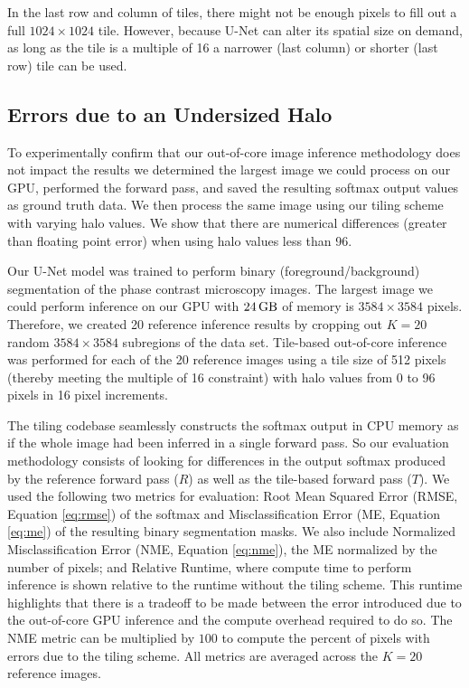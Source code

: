 \documentclass[10pt, indentfirst]{article}
\begin{document}
In the last row and column of tiles, there might not be enough pixels to fill out a full $1024 \times 1024$ tile. However, because U-Net can alter its spatial size on demand, as long as the tile is a multiple of 16 a narrower (last column) or shorter (last row) tile can be used. 


\subsection{Errors due to an Undersized Halo}

To experimentally confirm that our out-of-core image inference methodology does not impact the results we determined the largest image we could process on our GPU, performed the forward pass, and saved the resulting softmax output values as ground truth data. We then process the same image using our tiling scheme with varying halo values. We show that there are numerical differences (greater than floating point error) when using halo values less than 96. 

Our U-Net model was trained to perform binary (foreground/background) segmentation of the phase contrast microscopy images. The largest image we could perform inference on our GPU with $\SI{24}{\giga\byte}$ of memory is $3584 \times 3584$ pixels. Therefore, we created 20 reference inference results by cropping out $K = 20$ random $3584 \times 3584$ subregions of the data set. 
Tile-based out-of-core inference was performed for each of the 20 reference images using a tile size of 512 pixels (thereby meeting the multiple of 16 constraint) with halo values from 0 to 96 pixels in 16 pixel increments. 

The tiling codebase seamlessly constructs the softmax output in CPU memory as if the whole image had been inferred in a single forward pass. So our evaluation methodology consists of looking for differences in the output softmax produced by the reference forward pass ($R$) as well as the tile-based forward pass ($T$). We used the following two metrics for evaluation: Root Mean Squared Error (RMSE, Equation \ref{eq:rmse}) of the softmax and Misclassification Error (ME, Equation \ref{eq:me}) of the resulting binary segmentation masks. %
We also include Normalized Misclassification Error (NME, Equation \ref{eq:nme}), the ME normalized by the number of pixels; and Relative Runtime, where compute time to perform inference is shown relative to the runtime without the tiling scheme. This runtime highlights that there is a tradeoff to be made between the error introduced due to the out-of-core GPU inference and the compute overhead required to do so. The NME metric can be multiplied by $100$ to compute the percent of pixels with errors due to the tiling scheme.
All metrics are averaged across the $K = 20$ reference images.
\end{document}
